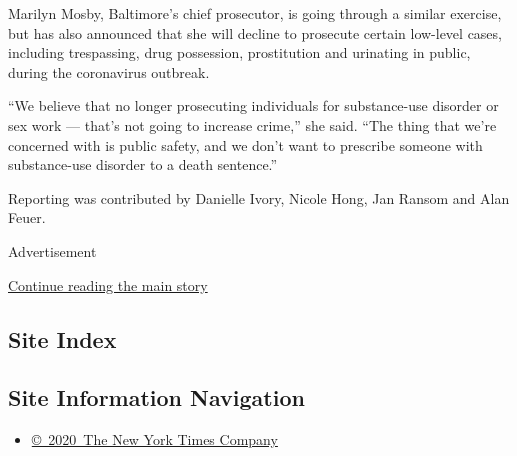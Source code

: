 Marilyn Mosby, Baltimore's chief prosecutor, is going through a similar
exercise, but has also announced that she will decline to prosecute
certain low-level cases, including trespassing, drug possession,
prostitution and urinating in public, during the coronavirus outbreak.

``We believe that no longer prosecuting individuals for substance-use
disorder or sex work --- that's not going to increase crime,'' she said.
``The thing that we're concerned with is public safety, and we don't
want to prescribe someone with substance-use disorder to a death
sentence.''

Reporting was contributed by Danielle Ivory, Nicole Hong, Jan Ransom and
Alan Feuer.

Advertisement

\protect\hyperlink{after-bottom}{Continue reading the main story}

\hypertarget{site-index}{%
\subsection{Site Index}\label{site-index}}

\hypertarget{site-information-navigation}{%
\subsection{Site Information
Navigation}\label{site-information-navigation}}

\begin{itemize}
\tightlist
\item
  \href{https://help.nytimes3xbfgragh.onion/hc/en-us/articles/115014792127-Copyright-notice}{©~2020~The
  New York Times Company}
\end{itemize}


